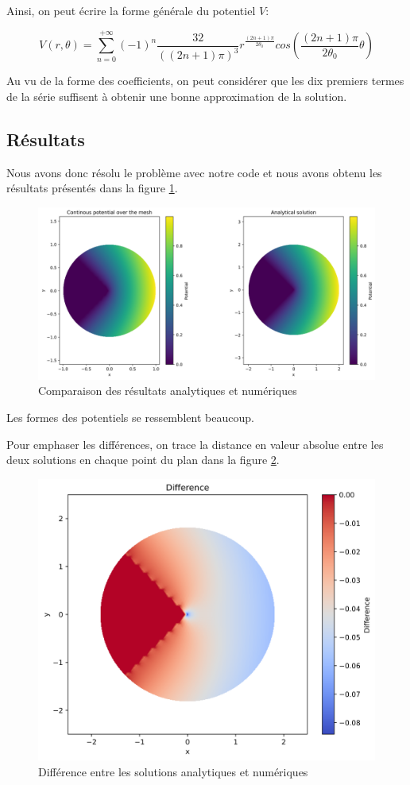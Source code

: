 \documentclass{article}
\begin{document}
Ainsi, on peut écrire la forme générale du potentiel $V$:

\begin{equation}
    V(r, \theta) = \sum_{n=0}^{+\infty}
    \left(-1\right)^n \frac{32}{
        \left((2n+1)\pi\right)^3}
    r^{\frac{(2n+1)\pi}{2 \theta_0}}
    cos\left(\frac{(2n+1)\pi}{2\theta_0}\theta\right)
\end{equation}

Au vu de la forme des coefficients, on peut considérer que 
les dix premiers termes de la série suffisent à obtenir une
bonne approximation de la solution.

\newpage

\subsection{Résultats}

Nous avons donc résolu le problème avec notre code
et nous avons obtenu les résultats présentés dans la
figure \ref{fig:analytic_vs_numeric}.

\begin{figure}[h]
    \centering
    \includegraphics[scale=0.5]{img/comparison.png}
    \caption{Comparaison des résultats analytiques et numériques}
    \label{fig:analytic_vs_numeric}
\end{figure}

Les formes des potentiels se ressemblent beaucoup.

Pour emphaser les différences, on trace la distance en valeur
absolue entre les deux solutions en chaque point du plan
dans la figure \ref{fig:diff}.

\begin{figure}[h]
    \centering
    \includegraphics[scale=0.5]{img/difference.png}
    \caption{Différence entre les solutions analytiques et numériques}
    \label{fig:diff}
\end{figure}
\end{document}
